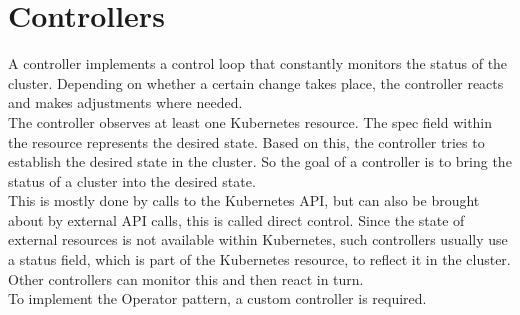 \section{Controllers}\label{sec:controllers}
A controller implements a control loop that constantly monitors the status of the cluster.
Depending on whether a certain change takes place, the controller reacts and makes adjustments where needed.
\\
The controller observes at least one Kubernetes resource.
The spec field within the resource represents the desired state.
Based on this, the controller tries to establish the desired state in the cluster.
So the goal of a controller is to bring the status of a cluster into the desired state.
\\
This is mostly done by calls to the Kubernetes API, but can also be brought about by external API calls, this is called direct control.
Since the state of external resources is not available within Kubernetes, such controllers usually use a status field, which is part of the Kubernetes resource, to reflect it in the cluster.
Other controllers can monitor this and then react in turn.
\\
To implement the Operator pattern, a custom controller is required.
~\cite{KUBERNETES-CONTROLLERS}